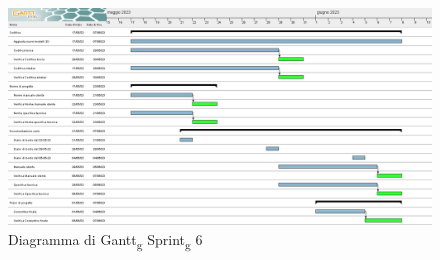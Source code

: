 \begin{figure}[H]
	\centering 
	\includegraphics[scale=0.32]{image/gantt_sprint6.PNG}
	\caption{Diagramma di Gantt\textsubscript{g} Sprint\textsubscript{g} 6}
\end{figure}
\pagebreak